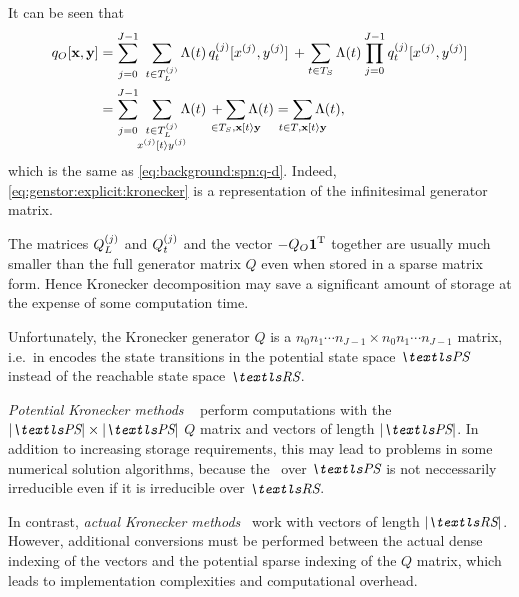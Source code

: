 It can be seen that
\begin{align}
  q_O[\vec{x}, \vec{y}]
  &= \sum_{\vphantom{\loc{T_L}{j}}j = 0}^{J - 1} \,\, \sum_{t \in
    \loc{T_L}{j}} \Lambda(t) \,
    \loc{q_t}{j}[\loc{x}{j}, \loc{y}{j}] \, + \sum_{t \in T_S} \Lambda(t)
    \prod_{\vphantom{T_S}j = 0}^{J - 1}
    \loc{q_t}{j}[\loc{x}{j}, \loc{y}{j}] \\
  &= \sum_{\vphantom{\loc{T_L}{j}}j = 0}^{J - 1} \,\,
    \sum_{\substack{\vphantom{\loc{T_L}{j}}t \in \loc{T_L}{j} \\
  \mathclap{\loc{x}{j} \tranto{t} \loc{y}{j}}}} \Lambda(t) \, +
  \sum_{\mathclap{\in T_S, \vec{x} \tranto{t} \vec{y}}} \Lambda(t)
  = \sum_{\mathclap{\vphantom{T_S}t \in T, \vec{x} \tranto{t}
  \vec{y}}} \Lambda(t) \text,
  \label{eq:genstor:explicit:block:qblock}
\end{align}
which is the same as \vref{eq:background:spn:q-d}. Indeed,
\cref{eq:genstor:explicit:kronecker} is a representation of the
infinitesimal generator matrix.

The matrices $Q_L^{(j)}$ and $Q_t^{(j)}$ and the vector
$-Q_O \bm{\mathrm{1}}^{\mathrm{T}}$ together are usually much smaller than the full
generator matrix $Q$ even when stored in a sparse matrix form. Hence
Kronecker decomposition may save a significant amount of storage at
the expense of some computation time.

Unfortunately, the Kronecker generator $Q$ is a
$n_0 n_1 \cdots n_{J - 1} \times n_0 n_1 \cdots n_{J - 1}$ matrix,
i.e.~in encodes the state transitions in the potential state space
$\PS$ instead of the reachable state space $\RS$.

\emph{Potential Kronecker methods}%
~\citep{DBLP:journals/informs/BuchholzCDK00} perform computations with
the $\lvert \PS \rvert \times \lvert \PS \rvert$ $Q$ matrix and
vectors of length $\lvert \PS \rvert$. In addition to increasing
storage requirements, this may lead to problems in some numerical
solution algorithms, because the \CTMC\ over $\PS$ is not neccessarily
irreducible even if it is irreducible over $\RS$.

In contrast, \emph{actual Kronecker methods}~%
\citep{DBLP:journals/tse/Kemper96,%
  DBLP:journals/informs/BuchholzCDK00,%
  DBLP:journals/fgcs/BenoitPS06} work with vectors of length
$\lvert \RS \rvert$. However, additional conversions must be performed
between the actual dense indexing of the vectors and the potential
sparse indexing of the $Q$ matrix, which leads to implementation
complexities and computational overhead.

